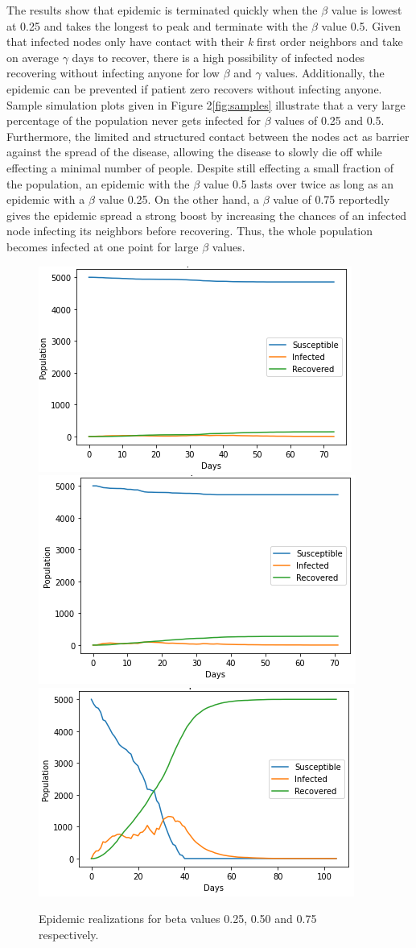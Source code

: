 \documentclass{article}
\begin{document}
\noindent
The results show that epidemic is terminated quickly when the $\beta$ value is lowest at 0.25 and takes the longest to peak and terminate with the $\beta$ value 0.5. Given that infected nodes only have contact with their {\it k} first order neighbors and take on average $\gamma$ days to recover, there is a high possibility of infected nodes recovering without infecting anyone for low $\beta$ and $\gamma$ values. Additionally, the epidemic can be prevented if patient zero recovers without infecting anyone. \\

\noindent
Sample simulation plots given in Figure 2\ref{fig:samples} illustrate that a very large percentage of the population never gets infected for $\beta$ values of 0.25 and 0.5. Furthermore, the limited and structured contact between the nodes act as barrier against the spread of the disease, allowing the disease to slowly die off while effecting a minimal number of people. Despite still effecting a small fraction of the population, an epidemic with the $\beta$ value 0.5 lasts over twice as long as an epidemic with a $\beta$ value 0.25. On the other hand, a $\beta$ value of 0.75 reportedly gives the epidemic spread a strong boost by increasing the chances of an infected node infecting its neighbors before recovering. Thus, the whole population becomes infected at one point for large $\beta$ values. \\

\begin{figure}[H]
\begin{adjustbox}{max width=1.2\linewidth,center}
\centering
\includegraphics[width=.4\textwidth]{images/beta025.png}\hfill
\includegraphics[width=.4\textwidth]{images/beta050.png}\hfill
\includegraphics[width=.4\textwidth]{images/beta075.png}
\end{adjustbox}
\caption{Epidemic realizations for beta values 0.25, 0.50 and 0.75 respectively.}
\end{figure} \label{fig:samples}
\end{document}
